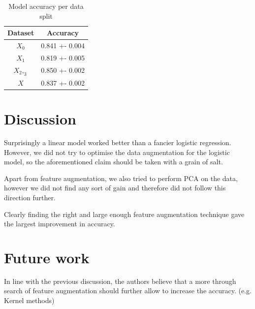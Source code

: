 \documentclass[10pt,conference,compsocconf]{IEEEtran}
\begin{document}
\begin{table}[h!]
\centering
\begin{tabular}{||c c||} 
 \hline
 Dataset & Accuracy \\ [0.5ex] 
 \hline\hline
 $X_0$ & 0.841 +- 0.004  \\ [0.5ex] 
 $X_1$ & 0.819 +- 0.005 \\[0.5ex] 
 $X_2,_3$ & 0.850 +- 0.002 \\[0.5ex] 
 \hline\hline
 $X$ & 0.837 +- 0.002 \\

 \hline
\end{tabular}
\caption{Model accuracy per data split}
\label{table:2}
\end{table}
\section{Discussion}

Surprisingly a linear model worked better than a fancier logistic regression. However, we did not try to optimise the data augmentation for the logistic model, so the aforementioned claim should be taken with a grain of salt.

Apart from feature augmentation, we also tried to perform
PCA on the data, however we did not find any sort of gain and therefore did not follow this direction further.

Clearly finding the right and large enough feature augmentation technique gave the largest improvement in accuracy.

\section{Future work}

In line with the previous discussion, the authors believe that a more through search of feature augmentation should further allow to increase the accuracy. (e.g. Kernel methods)




\end{document}
